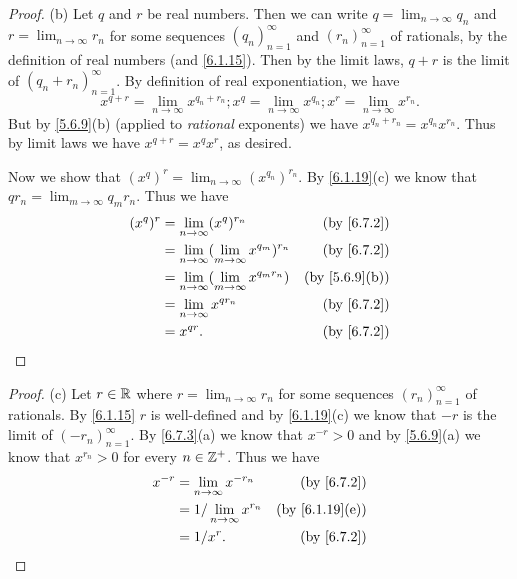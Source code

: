 \begin{proof}{(b)}
  Let \(q\) and \(r\) be real numbers.
  Then we can write \(q = \lim_{n \to \infty} q_n\) and \(r = \lim_{n \to \infty} r_n\) for some sequences \((q_n)_{n = 1}^\infty\) and \((r_n)_{n = 1}^\infty\) of rationals, by the definition of real numbers (and \cref{6.1.15}).
  Then by the limit laws, \(q + r\) is the limit of \((q_n + r_n)_{n = 1}^\infty\).
  By definition of real exponentiation, we have
  \[
    x^{q + r} = \lim_{n \to \infty} x^{q_n + r_n} ; x^q = \lim_{n \to \infty} x^{q_n} ;  x^r = \lim_{n \to \infty} x^{r_n}.
  \]
  But by \cref{5.6.9}(b) (applied to \emph{rational} exponents) we have \(x^{q_n + r_n} = x^{q_n} x^{r_n}\).
  Thus by limit laws we have \(x^{q + r} = x^q x^r\), as desired.

  Now we show that \((x^q)^r = \lim_{n \to \infty} (x^{q_n})^{r_n}\).
  By \cref{6.1.19}(c) we know that \(q r_n = \lim_{m \to \infty} q_m r_n\).
  Thus we have
  \begin{align*}
    (x^q)^r & = \lim_{n \to \infty} (x^q)^{r_n}                         & \text{(by \cref{6.7.2})}    \\
            & = \lim_{n \to \infty} (\lim_{m \to \infty} x^{q_m})^{r_n} & \text{(by \cref{6.7.2})}    \\
            & = \lim_{n \to \infty} (\lim_{m \to \infty} x^{q_m r_n})   & \text{(by \cref{5.6.9}(b))} \\
            & = \lim_{n \to \infty} x^{q r_n}                           & \text{(by \cref{6.7.2})}    \\
            & = x^{qr}.                                                 & \text{(by \cref{6.7.2})}
  \end{align*}
\end{proof}

\begin{proof}{(c)}
  Let \(r \in \mathbb{R}\) where \(r = \lim_{n \to \infty} r_n\) for some sequences \((r_n)_{n = 1}^\infty\) of rationals.
  By \cref{6.1.15} \(r\) is well-defined and by \cref{6.1.19}(c) we know that \(-r\) is the limit of \((-r_n)_{n = 1}^\infty\).
  By \cref{6.7.3}(a) we know that \(x^{-r} > 0\) and by \cref{5.6.9}(a) we know that \(x^{r_n} > 0\) for every \(n \in \mathbb{Z}^+\).
  Thus we have
  \begin{align*}
    x^{-r} & = \lim_{n \to \infty} x^{-r_n}    & \text{(by \cref{6.7.2})}     \\
           & = 1 / \lim_{n \to \infty} x^{r_n} & \text{(by \cref{6.1.19}(e))} \\
           & = 1 / x^r.                        & \text{(by \cref{6.7.2})}
  \end{align*}
\end{proof}

